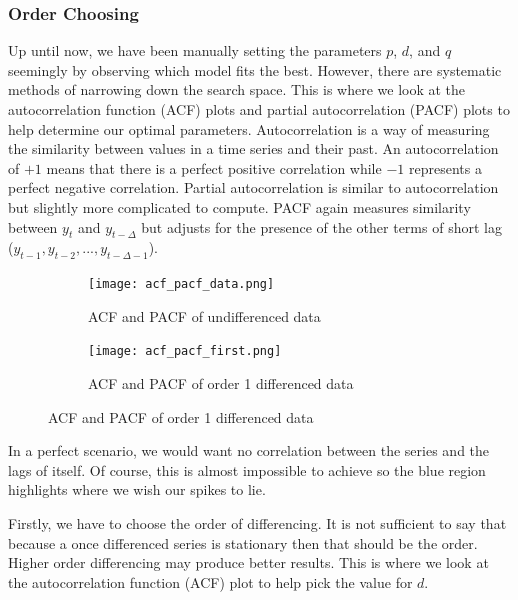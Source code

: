 \documentclass{article}
\begin{document}
  \newpage
  \subsubsection{Order Choosing}
  Up until now, we have been manually setting the parameters $p$, $d$, and $q$ seemingly by observing which model fits the best. However, there are systematic methods of narrowing down the search space. This is where we look at the autocorrelation function (ACF) plots and partial autocorrelation (PACF) plots to help determine our optimal parameters. Autocorrelation is a way of measuring the similarity between values in a time series and their past. An autocorrelation of $+1$ means that there is a perfect positive correlation while $-1$ represents a perfect negative correlation. Partial autocorrelation is similar to autocorrelation but slightly more complicated to compute. PACF again measures similarity between $y_t$ and $y_{t-\Delta}$ but adjusts for the presence of the other terms of short lag ($y_{t-1}, y_{t-2},...,y_{t-\Delta-1}$).

  \begin{figure}[H]
    \centering
    \captionsetup{justification=centering}
    \begin{subfigure}[b]{\linewidth}
      \texttt{[image: acf\_pacf\_data.png]}
      \caption{ACF and PACF of undifferenced data}
    \end{subfigure}
    \begin{subfigure}[b]{\linewidth}
      \texttt{[image: acf\_pacf\_first.png]}
      \caption{ACF and PACF of order 1 differenced data}
    \end{subfigure}
  \end{figure}
  

  In a perfect scenario, we would want no correlation between the series and the lags of itself. Of course, this is almost impossible to achieve so the blue region highlights where we wish our spikes to lie. 

  Firstly, we have to choose the order of differencing. It is not sufficient to say that because a once differenced series is stationary then that should be the order. Higher order differencing may produce better results. This is where we look at the autocorrelation function (ACF) plot to help pick the value for $d$. 
\end{document}
